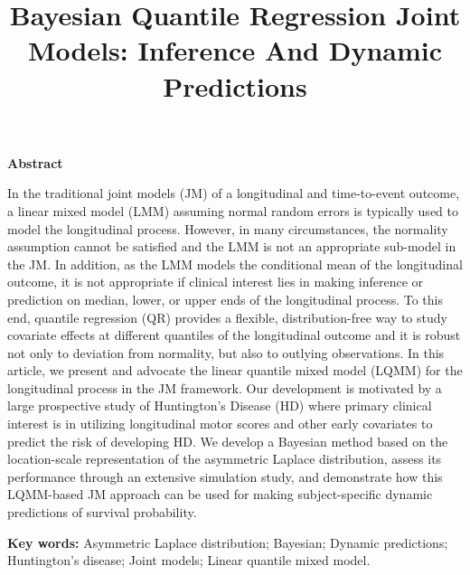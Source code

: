 \title{Bayesian Quantile Regression Joint Models: Inference And Dynamic Predictions}

\author{}
\date{}
\maketitle


\begin{center}
{\bf Abstract}
\end{center}

In the traditional joint models (JM) of a longitudinal and time-to-event outcome, a linear mixed model (LMM) assuming normal random errors is typically used to model the longitudinal process. However, in many circumstances, the normality assumption cannot be satisfied and the LMM is not an appropriate sub-model in the JM. In addition, as the LMM models the conditional mean of the longitudinal outcome, it is not appropriate if clinical interest lies in making inference or prediction on median, lower, or upper ends of the longitudinal process. To this end, quantile regression (QR) provides a flexible, distribution-free way to study covariate effects at different quantiles of the longitudinal outcome and it is robust not only to deviation from normality, but also to outlying observations. In this article, we present and advocate the linear quantile mixed model (LQMM) for the longitudinal process in the JM framework. Our development is motivated by a large prospective study of Huntington's Disease (HD) where primary clinical interest is in utilizing longitudinal motor scores and other early covariates to predict the risk of developing HD. We develop a Bayesian method based on the location-scale representation of the asymmetric Laplace distribution, assess its performance through an extensive simulation study, and demonstrate how this LQMM-based JM approach can be used for making subject-specific dynamic predictions of survival probability.

{\bf Key words:} Asymmetric Laplace distribution; Bayesian; Dynamic predictions; Huntington's disease; Joint models; Linear quantile mixed model.